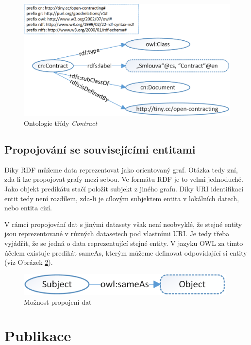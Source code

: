 \begin{figure}[h]
\centerline{\includegraphics[width=\textwidth]{img/rdf_ontologyClass.eps}}
\caption{Ontologie třídy \textit{Contract}}
\label{obr:rdf_ontologyClass}
\end{figure}

\subsection{Propojování se souvisejícími entitami}

Díky RDF můžeme data reprezentovat jako orientovaný graf. Otázka tedy zní, zda-li lze propojovat grafy mezi sebou. Ve formátu RDF je to velmi jednoduché. Jako objekt predikátu stačí položit subjekt z jiného grafu. Díky URI identifikaci entit tedy není rozdílem, zda-li je cílovým subjektem entita v lokálních datech, nebo entita cizí.  

V rámci propojování dat s jinými datasety však není neobvyklé, že stejné entity jsou reprezentované v různých datasetech pod vlastními URI. Je tedy třeba vyjádřit, že se jedná o data reprezentující stejné entity. V jazyku OWL za tímto účelem existuje predikát sameAs, kterým můžeme definovat odpovídající si entity (viz Obrázek \ref{obr:rdf_ontologyLinks}).

\begin{figure}[h]
\centerline{\includegraphics[width=110mm]{img/rdf_ontologyLinks.eps}}
\caption{Možnost propojení dat}
\label{obr:rdf_ontologyLinks}
\end{figure}

\newpage

\section{Publikace}

